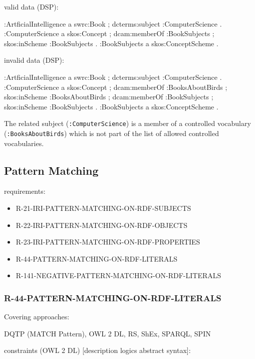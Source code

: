 \documentclass{llncs}
\newcommand{\ms}[1]{\texttt{#1}}
\begin{document}
valid data (DSP):

\begin{ex}
:ArtficialIntelligence
    a swrc:Book ;
    dcterms:subject :ComputerScience .
:ComputerScience
    a skos:Concept ;
    dcam:memberOf :BookSubjects ;
    skos:inScheme :BookSubjects .
:BookSubjects
    a skos:ConceptScheme .
\end{ex}

invalid data (DSP):

\begin{ex}
:ArtficialIntelligence
    a swrc:Book ;
    dcterms:subject :ComputerScience .
:ComputerScience
    a skos:Concept ;
    dcam:memberOf :BooksAboutBirds ;
    skos:inScheme :BooksAboutBirds ;
    dcam:memberOf :BookSubjects ;
    skos:inScheme :BookSubjects .
:BookSubjects
    a skos:ConceptScheme .
\end{ex}

The related subject (\ms{:ComputerScience}) is a member of a controlled vocabulary (\ms{:BooksAboutBirds}) 
which is not part of the list of allowed controlled vocabularies.

\subsection{Pattern Matching}

requirements:

\begin{itemize}
	\item R-21-IRI-PATTERN-MATCHING-ON-RDF-SUBJECTS
  \item R-22-IRI-PATTERN-MATCHING-ON-RDF-OBJECTS
  \item R-23-IRI-PATTERN-MATCHING-ON-RDF-PROPERTIES
  \item R-44-PATTERN-MATCHING-ON-RDF-LITERALS
  \item R-141-NEGATIVE-PATTERN-MATCHING-ON-RDF-LITERALS
\end{itemize}

\subsubsection{R-44-PATTERN-MATCHING-ON-RDF-LITERALS}

Covering approaches:

DQTP (MATCH Pattern), OWL 2 DL, RS, ShEx, SPARQL, SPIN

constraints (OWL 2 DL) [description logics abstract syntax]:

\begin{ex}

\end{ex}
\end{document}
